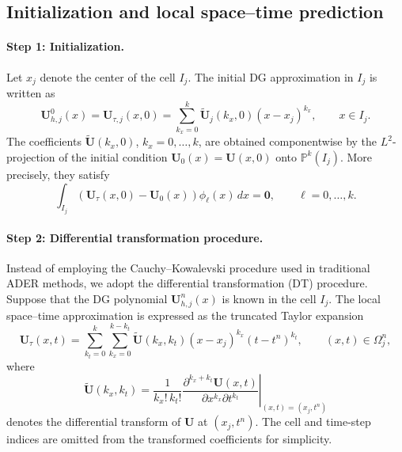 \documentclass[11pt]{article}
\begin{document}
\subsection{Initialization and local space--time prediction}

\paragraph{Step 1: Initialization.}

Let \(x_j\) denote the center of the cell \(I_j\). The initial DG
approximation in \(I_j\) is written as
\begin{equation}
    \mathbf{U}_{h,j}^{0}(x) = \mathbf{U}_{\tau,j}(x,0)
    =
    \sum_{k_x=0}^{k}
    \widetilde{\mathbf{U}}_j(k_x,0)
    (x-x_j)^{k_x},
    \qquad x\in I_j.
    \tag{9}
\end{equation}
The coefficients
\(\widetilde{\mathbf{U}}(k_x,0)\), \(k_x=0,\ldots,k\), are obtained
componentwise by the \(L^2\)-projection of the initial condition
\(\mathbf{U}_0(x)=\mathbf{U}(x,0)\) onto
\(\mathbb{P}^k(I_j)\). More precisely, they satisfy
\[
    \int_{I_j}
    \left(
        \mathbf{U}_{\tau}(x,0)-\mathbf{U}_0(x)
    \right)
    \phi_{\ell}(x)\,dx
    =
    \mathbf{0},
    \qquad \ell=0,\ldots,k.
\]

\paragraph{Step 2: Differential transformation procedure.}

Instead of employing the Cauchy--Kowalevski procedure used in
traditional ADER methods, we adopt the differential transformation
(DT) procedure. Suppose that the DG polynomial
\(\mathbf{U}_{h,j}^n(x)\) is known in the cell \(I_j\). The local
space--time approximation is expressed as the truncated Taylor
expansion
\begin{equation}
    \mathbf{U}_{\tau}(x,t)
    =
    \sum_{k_t=0}^{k}
    \sum_{k_x=0}^{k-k_t}
    \widetilde{\mathbf{U}}(k_x,k_t)
    (x-x_j)^{k_x}(t-t^n)^{k_t},
    \qquad (x,t)\in\Omega_j^n,
    \tag{10a}
\end{equation}
where
\begin{equation}
    \widetilde{\mathbf{U}}(k_x,k_t)
    =
    \frac{1}{k_x!\,k_t!}
    \left.
    \frac{\partial^{k_x+k_t}\mathbf{U}(x,t)}
         {\partial x^{k_x}\partial t^{k_t}}
    \right|_{(x,t)=(x_j,t^n)}
    \tag{10b}
\end{equation}
denotes the differential transform of \(\mathbf{U}\) at
\((x_j,t^n)\). The cell and time-step indices are omitted from the
transformed coefficients for simplicity.
\end{document}

